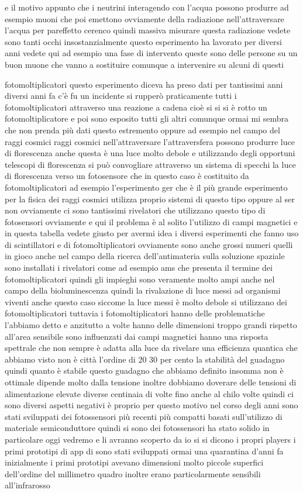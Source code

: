 e il motivo appunto che i neutrini interagendo con l'acqua possono produrre ad esempio muoni che poi emettono ovviamente della radiazione nell'attraversare l'acqua per pareffetto cerenco quindi massiva misurare questa radiazione vedete sono tanti occhi insostanzialmente questo esperimento ha lavorato per diversi anni vedete qui ad esempio una fase di intervento queste sono delle persone su un buon muone che vanno a sostituire comunque a intervenire su alcuni di questi 

fotomoltiplicatori questo esperimento diceva ha preso dati per tantissimi anni diversi anni fa c'è fu un incidente si rupperò praticamente tutti i fotomoltiplicatori attraverso una reazione a cadena cioè si si si è rotto un fotomoltiplicatore e poi sono esposito tutti gli altri comunque ormai mi sembra che non prenda più dati questo estremento oppure ad esempio nel campo del raggi cosmici raggi cosmici nell'attraversare l'attraversfera possono produrre luce di florescenza anche questa è una luce molto debole e utilizzando degli opportuni telescopi di florescenza si può convogliare attraverso un sistema di specchi la luce di florescenza verso un fotosensore che in questo caso è costituito da fotomoltiplicatori ad esempio l'esperimento ger che è il più grande esperimento per la fisica dei raggi cosmici utilizza proprio sistemi di questo tipo oppure al ser non ovviamente ci sono tantissimi rivelatori che utilizzano questo tipo di fotosensori ovviamente e qui il problema è al solito l'utilizzo di campi magnetici e in questa tabella vedete giusto per avermi idea i diversi esperimenti che fanno uso di scintillatori e di fotomoltiplicatori ovviamente sono anche grossi numeri quelli in gioco anche nel campo della ricerca dell'antimateria sulla soluzione spaziale sono installati i rivelatori come ad esempio ams che presenta il termine dei fotomoltiplicatori quindi gli impieghi sono veramente molto ampi anche nel campo della bioluminescenza quindi la rivalazione di luce messi ad organismi viventi anche questo caso siccome la luce messi è molto debole si utilizzano dei fotomoltiplicatori tuttavia i fotomoltiplicatori hanno delle problematiche l'abbiamo detto e anzitutto a volte hanno delle dimensioni troppo grandi rispetto all'area sensibile sono influenzati dai campi magnetici hanno una risposta spettrale che non sempre è adatta alla luce da rivelare una efficienza quantica che abbiamo visto non è città l'ordine di 20 30 per cento la stabilità del guadagno quindi quanto è stabile questo guadagno che abbiamo definito insomma non è ottimale dipende molto dalla tensione inoltre dobbiamo doverare delle tensioni di alimentazione elevate diverse centinaia di volte fino anche al chilo volte quindi ci sono diversi aspetti negativi è proprio per questo motivo nel corso degli anni sono stati sviluppati dei fotossensori più recenti più compatti basati sull'utilizzo di materiale semiconduttore quindi si sono dei fotossensori ha stato solido in particolare oggi vedremo e li avranno scoperto da io si si dicono i propri players i primi prototipi di app di sono stati sviluppati ormai una quarantina d'anni fa inizialmente i primi prototipi avevano dimensioni molto piccole superfici dell'ordine del millimetro quadro inoltre erano particolarmente sensibili all'infrarosso 